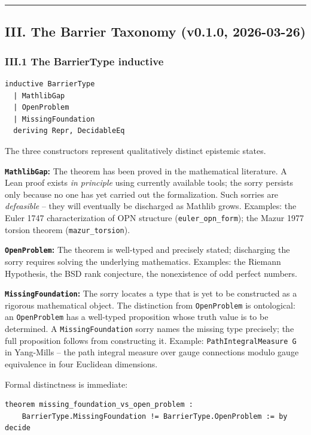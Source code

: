 \documentclass[12pt,a4paper]{article}
\begin{document}
\begin{center}
\rule{0.5\textwidth}{0.4pt}
\end{center}

\subsection{III. The Barrier Taxonomy (v0.1.0, 2026-03-26)}

\subsubsection{III.1 The BarrierType inductive}

\begin{lstlisting}[language=lean]
inductive BarrierType
  | MathlibGap
  | OpenProblem
  | MissingFoundation
  deriving Repr, DecidableEq
\end{lstlisting}

The three constructors represent qualitatively distinct epistemic states.

\textbf{\texttt{MathlibGap}:} The theorem has been proved in the mathematical literature. A Lean proof exists \emph{in principle} using currently available tools; the sorry persists only because no one has yet carried out the formalization. Such sorries are \emph{defeasible}  --  they will eventually be discharged as Mathlib grows. Examples: the Euler 1747 characterization of OPN structure (\texttt{euler\_opn\_form}); the Mazur 1977 torsion theorem (\texttt{mazur\_torsion}).

\textbf{\texttt{OpenProblem}:} The theorem is well-typed and precisely stated; discharging the sorry requires solving the underlying mathematics. Examples: the Riemann Hypothesis, the BSD rank conjecture, the nonexistence of odd perfect numbers.

\textbf{\texttt{MissingFoundation}:} The sorry locates a type that is yet to be constructed as a rigorous mathematical object. The distinction from \texttt{OpenProblem} is ontological: an \texttt{OpenProblem} has a well-typed proposition whose truth value is to be determined. A \texttt{MissingFoundation} sorry names the missing type precisely; the full proposition follows from constructing it. Example: \texttt{PathIntegralMeasure G} in Yang-Mills  --  the path integral measure over gauge connections modulo gauge equivalence in four Euclidean dimensions.

Formal distinctness is immediate:

\begin{lstlisting}[language=lean]
theorem missing_foundation_vs_open_problem :
    BarrierType.MissingFoundation != BarrierType.OpenProblem := by decide
\end{lstlisting}
\end{document}

